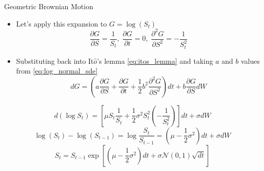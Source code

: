 \documentclass{beamer}
\begin{document}
\begin{frame}{Geometric Brownian Motion}
	\begin{itemize}
		\item Let's apply this expansion to $G=\log(S_t)$ 
		\begin{equation*}
			\frac{\partial G}{\partial S}=\frac{1}{S_t},\;\frac{\partial G}{\partial t}=0,\;\frac{\partial^2 G}{\partial S^2}=-\frac{1}{S_t^2}
		\end{equation*}
		\item Substituting back into It$\hat{o}$'s lemma \cref{eq:itos_lemma} and taking $a$ and $b$ values from \cref{eq:log_normal_sde}
		\begin{equation*}
			dG = \left(a\frac{\partial G}{\partial S} + \frac{\partial G}{\partial t} + \frac{1}{2}b^2\frac{\partial^2 G}{\partial S^2}\right)dt + b\frac{\partial G}{\partial S} dW
		\end{equation*}
	\end{itemize}

	\begin{equation*}
	d(\log S_t) = \left[\mu S_t\frac{1}{S_t} + \frac{1}{2}\sigma^2S_t^2\left(-\frac{1}{S_t^2}\right)\right]dt + \sigma dW
	\end{equation*}
	\begin{equation*}
	\log(S_t) - \log(S_{t-1}) = \log\frac{S_t}{S_{t-1}}=\left(\mu - \frac{1}{2}\sigma^2\right)dt + \sigma dW 
	\end{equation*}	
	\begin{equation}
	S_t = S_{t-1}\exp\left[\left(\mu-\frac{1}{2}\sigma^2\right)dt + \sigma\mathcal{N}(0,1)\sqrt{dt}\right] 
	\label{eq:lognormal_solution}
	\end{equation}
\end{frame}
\end{document}
